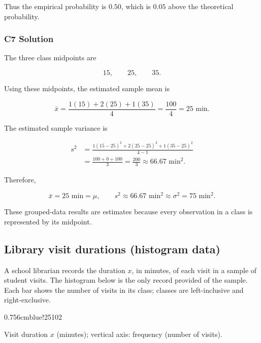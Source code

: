 Thus the empirical probability is $0.50$, which is $0.05$ above the
theoretical probability.


\subsubsection*{C7 Solution}
\label{subsec:c7-meanvar-grouped-b}

The three class midpoints are

\[
15,\qquad25,\qquad35.
\]

Using these midpoints, the estimated sample mean is

\[
\bar{x}
=\frac{1(15)+2(25)+1(35)}{4}
=\frac{100}{4}
=25\text{ min}.
\]

The estimated sample variance is

\[
\begin{aligned}
s^2
&=\frac{1(15-25)^2+2(25-25)^2+1(35-25)^2}{4-1}\\
&=\frac{100+0+100}{3}
=\frac{200}{3}
\approx66.67\text{ min}^2.
\end{aligned}
\]

Therefore,

\[
\boxed{\bar{x}=25\text{ min}=\mu,\qquad
s^2\approx66.67\text{ min}^2\approx\sigma^2=75\text{ min}^2.}
\]

These grouped-data results are estimates because every observation in a
class is represented by its midpoint.


\subsection{Library visit durations (histogram data)}
\label{sec:c6c7-histogram}

A school librarian records the duration $x$, in minutes, of each visit in
a sample of student visits. The histogram below is the only record provided
of the sample. Each bar shows the number of visits in its class; classes
are left-inclusive and right-exclusive.

    {0.75\textwidth}{6cm}{blue!25}{10}{2}

\begin{center}
    Visit duration $x$ (minutes); vertical axis: frequency (number of visits).
\end{center}

